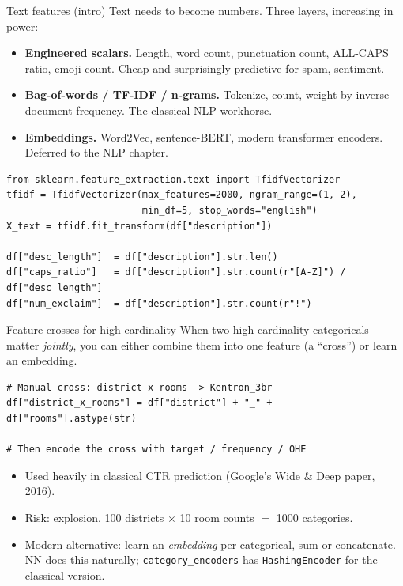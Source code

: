 \documentclass[aspectratio=169]{beamer}
\begin{document}
\begin{frame}[fragile]{Text features (intro)}
  Text needs to become numbers. Three layers, increasing in power:
  \vfill
  \begin{itemize}
    \item \textbf{Engineered scalars.} Length, word count, punctuation count, ALL-CAPS ratio, emoji count. Cheap and surprisingly predictive for spam, sentiment.
    \item \textbf{Bag-of-words / TF-IDF / n-grams.} Tokenize, count, weight by inverse document frequency. The classical NLP workhorse.
    \item \textbf{Embeddings.} Word2Vec, sentence-BERT, modern transformer encoders. Deferred to the NLP chapter.
  \end{itemize}
  \vfill
{\lstset{basicstyle=\ttfamily\scriptsize}
\begin{lstlisting}
from sklearn.feature_extraction.text import TfidfVectorizer
tfidf = TfidfVectorizer(max_features=2000, ngram_range=(1, 2),
                        min_df=5, stop_words="english")
X_text = tfidf.fit_transform(df["description"])

df["desc_length"]  = df["description"].str.len()
df["caps_ratio"]   = df["description"].str.count(r"[A-Z]") / df["desc_length"]
df["num_exclaim"]  = df["description"].str.count(r"!")
\end{lstlisting}}
\end{frame}

\begin{frame}[fragile]{Feature crosses for high-cardinality}
  When two high-cardinality categoricals matter \emph{jointly}, you can either combine them into one feature (a ``cross'') or learn an embedding.
  \vfill
{\lstset{basicstyle=\ttfamily\scriptsize}
\begin{lstlisting}
# Manual cross: district x rooms -> Kentron_3br
df["district_x_rooms"] = df["district"] + "_" + df["rooms"].astype(str)

# Then encode the cross with target / frequency / OHE
\end{lstlisting}}
  \vfill
  \begin{itemize}
    \item Used heavily in classical CTR prediction (Google's Wide \& Deep paper, 2016).
    \item Risk: explosion. 100 districts $\times$ 10 room counts $=$ 1000 categories.
    \item Modern alternative: learn an \emph{embedding} per categorical, sum or concatenate. NN does this naturally; \texttt{category\_encoders} has \texttt{HashingEncoder} for the classical version.
  \end{itemize}
\end{frame}
\end{document}
